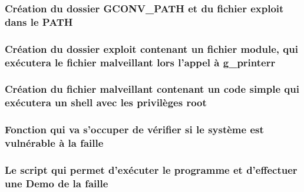 \documentclass[12pt,a4paper]{article}
\begin{document}
   		\subsubsection{Création du dossier GCONV\_PATH et du fichier exploit dans le PATH} 
   		  
            \subsubsection{Création du dossier exploit contenant un fichier module, qui exécutera le fichier malveillant lors l'appel à g\_printerr}
              
            \subsubsection{Création du fichier malveillant contenant un code simple qui exécutera un shell avec les privilèges root}
              
            \newpage
            \subsubsection{Fonction qui va s'occuper de vérifier si le système est vulnérable à la faille}
              

			\subsubsection{Le script qui permet d'exécuter le programme et d'effectuer une Demo de la faille} 
			  
   
\end{document}

